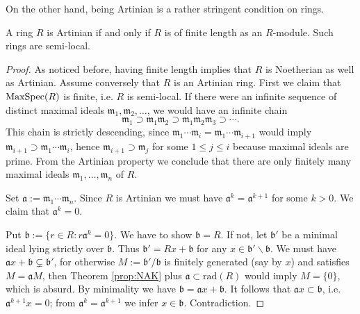 On the other hand, being Artinian is a rather stringent condition on rings.
\begin{theorem}\label{prop:Artinian-length}
	A ring $R$ is Artinian if and only if $R$ is of finite length as an $R$-module. Such rings are semi-local.
\end{theorem}
\begin{proof}
	As noticed before, having finite length implies that $R$ is Noetherian as well as Artinian. Assume conversely that $R$ is an Artinian ring. First we claim that $\operatorname{MaxSpec}(R)$ is finite, i.e. $R$ is semi-local. If there were an infinite sequence of distinct maximal ideals $\mathfrak{m}_1, \mathfrak{m}_2, \ldots$, we would have an infinite chain
	\[ \mathfrak{m}_1 \supset \mathfrak{m}_1 \mathfrak{m}_2 \supset \mathfrak{m}_1 \mathfrak{m}_2 \mathfrak{m}_3 \supset \cdots. \]
	This chain is strictly descending, since $\mathfrak{m}_1 \cdots \mathfrak{m}_i = \mathfrak{m}_1 \cdots \mathfrak{m}_{i+1}$ would imply $\mathfrak{m}_{i+1} \supset \mathfrak{m}_1 \cdots \mathfrak{m}_i$, hence $\mathfrak{m}_{i+1} \supset \mathfrak{m}_j$ for some $1 \leq j \leq i$ because maximal ideals are prime. From the Artinian property we conclude that there are only finitely many maximal ideals $\mathfrak{m}_1, \ldots, \mathfrak{m}_n$ of $R$.
	
	Set $\mathfrak{a} := \mathfrak{m}_1 \cdots \mathfrak{m}_n$. Since $R$ is Artinian we must have $\mathfrak{a}^k = \mathfrak{a}^{k+1}$ for some $k > 0$. We claim that $\mathfrak{a}^k = 0$.
	
	Put $\mathfrak{b} := \{r \in R: r\mathfrak{a}^k = 0 \}$. We have to show $\mathfrak{b}=R$. If not, let $\mathfrak{b}'$ be a minimal ideal lying strictly over $\mathfrak{b}$. Thus $\mathfrak{b}' = Rx + \mathfrak{b}$ for any $x \in \mathfrak{b}' \smallsetminus \mathfrak{b}$. We must have $\mathfrak{a}x + \mathfrak{b} \subsetneq \mathfrak{b}'$, for otherwise $M := \mathfrak{b}'/\mathfrak{b}$ is finitely generated (say by $x$) and satisfies $M = \mathfrak{a}M$, then Theorem \ref{prop:NAK} plus $\mathfrak{a} \subset \text{rad}(R)$ would imply $M = \{0\}$, which is absurd. By minimality we have $\mathfrak{b} = \mathfrak{a}x + \mathfrak{b}$. It follows that $\mathfrak{a}x \subset \mathfrak{b}$, i.e. $\mathfrak{a}^{k+1} x = 0$; from $\mathfrak{a}^k = \mathfrak{a}^{k+1}$ we infer $x \in \mathfrak{b}$. Contradiction.
	

\end{proof}
